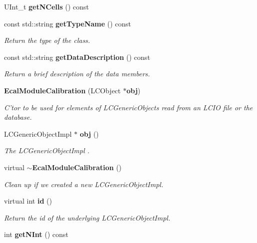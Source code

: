 \begin{DoxyCompactItemize}
\item 
U\-Int\-\_\-t {\bfseries get\-N\-Cells} () const \label{classCALICE_1_1EcalModuleCalibration_a5547cec59528f2baf4c10a0d918a9c00}

\item 
const std\-::string {\bf get\-Type\-Name} () const \label{classCALICE_1_1EcalModuleCalibration_a433c8e069f2c953af5616d0b0732cb64}

\begin{DoxyCompactList}\small\item\em Return the type of the class. \end{DoxyCompactList}\item 
const std\-::string {\bf get\-Data\-Description} () const \label{classCALICE_1_1EcalModuleCalibration_a661172c0b0e321926e1ff9efb11200ec}

\begin{DoxyCompactList}\small\item\em Return a brief description of the data members. \end{DoxyCompactList}\item 
{\bf Ecal\-Module\-Calibration} (L\-C\-Object $\ast${\bf obj})
\begin{DoxyCompactList}\small\item\em C'tor to be used for elements of L\-C\-Generic\-Objects read from an L\-C\-I\-O file or the database. \end{DoxyCompactList}\item 
L\-C\-Generic\-Object\-Impl $\ast$ {\bf obj} ()
\begin{DoxyCompactList}\small\item\em The L\-C\-Generic\-Object\-Impl . \end{DoxyCompactList}\item 
virtual {\bf $\sim$\-Ecal\-Module\-Calibration} ()\label{classCALICE_1_1EcalModuleCalibration_acc08af0cde6a964ec53ced5f89d97481}

\begin{DoxyCompactList}\small\item\em Clean up if we created a new L\-C\-Generic\-Object\-Impl. \end{DoxyCompactList}\item 
virtual int {\bf id} ()\label{classCALICE_1_1EcalModuleCalibration_a09b17f1686a33d636d25a83452d87775}

\begin{DoxyCompactList}\small\item\em Return the id of the underlying L\-C\-Generic\-Object\-Impl. \end{DoxyCompactList}\item 
int {\bfseries get\-N\-Int} () const \label{classCALICE_1_1EcalModuleCalibration_a88f003114047f844685d82594b3047b1}


\end{DoxyCompactItemize}
